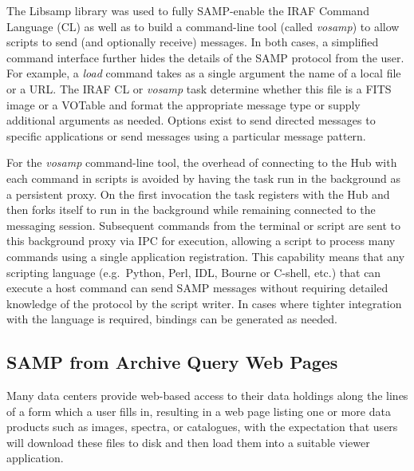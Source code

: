 The Libsamp library was used to fully SAMP-enable the IRAF Command Language (CL) as well as to build a command-line tool (called {\em {}vosamp\/}) to allow scripts to send (and optionally receive) messages.  In both cases, a simplified command interface further hides the details of the SAMP protocol from the user.  For example, a {\em load\/} command takes as a single argument the name of a local file or a URL. The IRAF CL or {\em {}vosamp\/} task determine whether this file is a FITS image or a VOTable and format the appropriate message type or supply additional arguments as needed. Options exist to send directed messages to specific applications or send messages using a particular message pattern.

For the {\em {}vosamp\/} command-line tool, the overhead of connecting to the Hub with each command in scripts is avoided by having the task run in the background as a persistent proxy.  On the first invocation the task registers with the Hub and then forks itself to run in the background while remaining connected to the messaging session.  Subsequent commands from the terminal or script are sent to this background proxy via IPC for execution, allowing a script to process many commands using a single application registration.  This capability means that any scripting language (e.g.\ Python, Perl, IDL, Bourne or C-shell, etc.) that can execute a host command can send SAMP messages without requiring detailed knowledge of the protocol by the script writer.  In cases where tighter integration with the language is required, bindings can be generated as needed.

\subsection{SAMP from Archive Query Web Pages}

Many data centers provide web-based access to their data holdings along the lines of a form which a user fills in, resulting in a web page listing one or more data products such as images, spectra, or catalogues, with the expectation that users will download these files to disk and then load them into a suitable viewer application.

